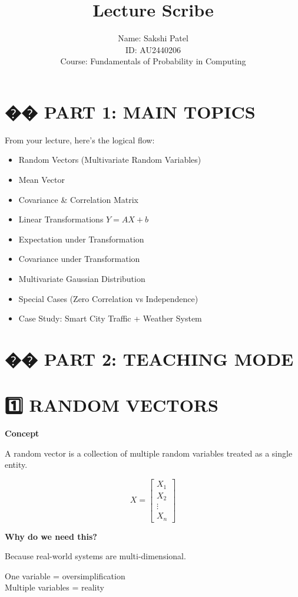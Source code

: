 \documentclass[12pt]{article}
\title{\textbf{Lecture Scribe}}
\author{
Name: Sakshi Patel\\
ID: AU2440206\\
Course: Fundamentals of Probability in Computing\\
}
\date{}
\begin{document}
\maketitle

\section*{�� PART 1: MAIN TOPICS }

From your lecture, here’s the logical flow:
\begin{itemize}
\item Random Vectors (Multivariate Random Variables)
\item Mean Vector
\item Covariance \& Correlation Matrix
\item Linear Transformations $Y = AX + b$
\item Expectation under Transformation
\item Covariance under Transformation
\item Multivariate Gaussian Distribution
\item Special Cases (Zero Correlation vs Independence)
\item Case Study: Smart City Traffic + Weather System
\end{itemize}

\section*{�� PART 2: TEACHING MODE }

\section*{1️⃣ RANDOM VECTORS}

\textbf{Concept}

A random vector is a collection of multiple random variables treated as a single entity.

\[
X =
\begin{bmatrix}
X_1 \\
X_2 \\
\vdots \\
X_n
\end{bmatrix}
\]

\textbf{Why do we need this?}

Because real-world systems are multi-dimensional.

One variable = oversimplification \\
Multiple variables = reality
\end{document}
